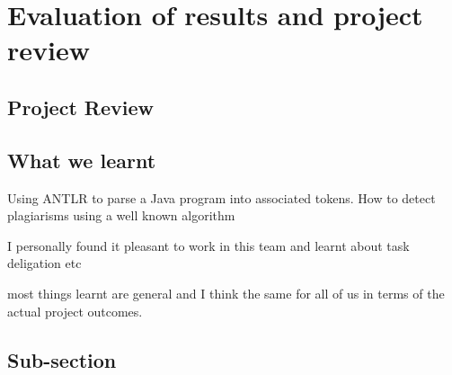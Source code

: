 \section{Evaluation of results and project review}

\subsection{Project Review}
\subsection{What we learnt}
Using ANTLR to parse a Java program into associated tokens. 
How to detect plagiarisms using a well known algorithm 

I personally found it pleasant to work in this team and learnt about task deligation etc 

most things learnt are general and I think the same for all of us in terms of the actual project outcomes.


\subsection{Sub-section}
\break